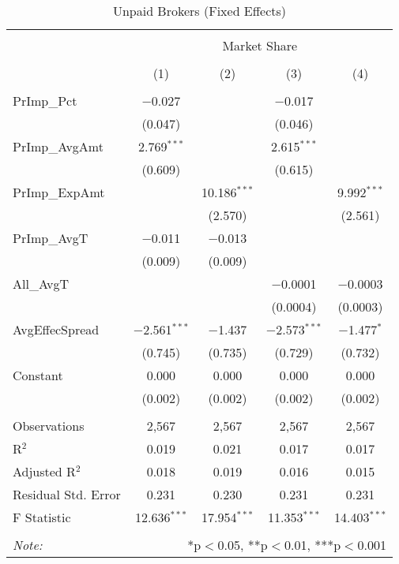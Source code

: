 \documentclass[12pt,a4paper]{article}
\begin{document}
		\begin{table}[!htbp] \centering 
			\captionsetup{font=large}
			\caption{Unpaid Brokers (Fixed Effects)} 
			\label{} 
			\begin{tabular}{@{\extracolsep{1em}}lcccc} 
				\\[-1.8ex]\hline 
				\hline \\[-1.8ex] 
				& \multicolumn{4}{c}{Market Share} \\ 
				\cline{2-5} 
				\\[-1.8ex] & (1) & (2) & (3) & (4)\\ 
				\hline \\[-1.8ex] 
				PrImp\_Pct & $-$0.027 &  & $-$0.017 &  \\ 
				& (0.047) &  & (0.046) &  \\ 
				PrImp\_AvgAmt & 2.769$^{***}$ &  & 2.615$^{***}$ &  \\ 
				& (0.609) &  & (0.615) &  \\ 
				PrImp\_ExpAmt &  & 10.186$^{***}$ &  & 9.992$^{***}$ \\ 
				&  & (2.570) &  & (2.561) \\ 
				PrImp\_AvgT & $-$0.011 & $-$0.013 &  &  \\ 
				& (0.009) & (0.009) &  &  \\ 
				All\_AvgT &  &  & $-$0.0001 & $-$0.0003 \\ 
				&  &  & (0.0004) & (0.0003) \\ 
				AvgEffecSpread & $-$2.561$^{***}$ & $-$1.437 & $-$2.573$^{***}$ & $-$1.477$^{*}$ \\ 
				& (0.745) & (0.735) & (0.729) & (0.732) \\ 
				Constant & 0.000 & 0.000 & 0.000 & 0.000 \\ 
				& (0.002) & (0.002) & (0.002) & (0.002) \\ 
				\hline \\[-1.8ex] 
				Observations & 2,567 & 2,567 & 2,567 & 2,567 \\ 
				R$^{2}$ & 0.019 & 0.021 & 0.017 & 0.017 \\ 
				Adjusted R$^{2}$ & 0.018 & 0.019 & 0.016 & 0.015 \\ 
				Residual Std. Error & 0.231  & 0.230  & 0.231  & 0.231  \\ 
				F Statistic & 12.636$^{***}$  & 17.954$^{***}$  & 11.353$^{***}$  & 14.403$^{***}$  \\ 
				\hline 
				\hline \\[-1.8ex] 
				\textit{Note:}  & \multicolumn{4}{r}{*p$<$0.05, **p$<$0.01, ***p$<$0.001} \\ 
			\end{tabular} 
		\end{table} 		
	
\end{document}
